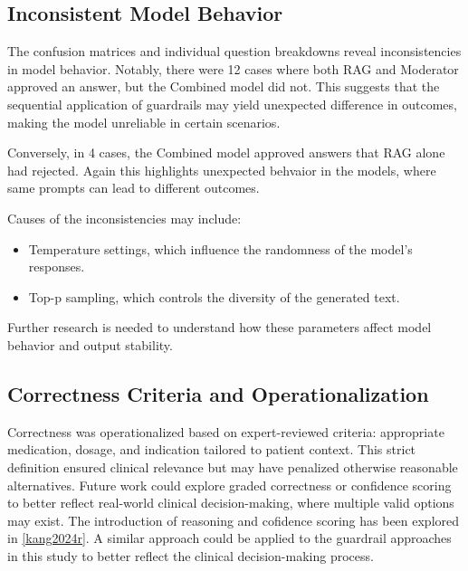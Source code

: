 \subsection{Inconsistent Model Behavior}
The confusion matrices and individual question breakdowns reveal inconsistencies in model behavior.
Notably, there were 12 cases where both RAG and Moderator approved an answer, but the Combined model did not.
This suggests that the sequential application of guardrails may yield unexpected difference in outcomes, making the model unreliable in certain scenarios.

Conversely, in 4 cases, the Combined model approved answers that RAG alone had rejected.
Again this highlights unexpected behvaior in the models, where same prompts can lead to different outcomes.

Causes of the inconsistencies may include:
\begin{itemize}
    \item Temperature settings, which influence the randomness of the model's responses.
    \item Top-p sampling, which controls the diversity of the generated text.
\end{itemize}
Further research is needed to understand how these parameters affect model behavior and output stability.

\subsection{Correctness Criteria and Operationalization}
Correctness was operationalized based on expert-reviewed criteria: appropriate medication, dosage, and indication tailored to patient context.
This strict definition ensured clinical relevance but may have penalized otherwise reasonable alternatives.
Future work could explore graded correctness or confidence scoring to better reflect real-world clinical decision-making, where multiple valid options may exist.
The introduction of reasoning and cofidence scoring has been explored in \autoref{kang2024r}.
A similar approach could be applied to the guardrail approaches in this study to better reflect the clinical decision-making process.

